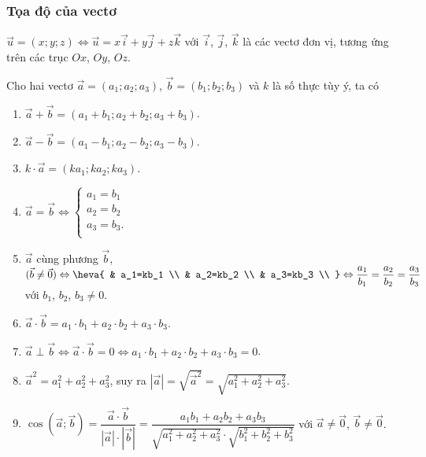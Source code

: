 \begin{tomtat}
	\subsubsection{Tọa độ của vectơ}
	\begin{dn}
		$\vec{u}=(x;y;z)\Leftrightarrow \vec{u}=x\vec{i}+y\vec{j}+z\vec{k}$ với $\vec{i}$, $\vec{j}$, $\vec{k}$ là các vectơ đơn vị, tương ứng trên các trục $Ox$, $Oy$, $Oz$.
		
	\end{dn}
	\begin{tc}
		Cho hai vectơ $\vec{a}=(a_1;a_2;a_3 )$, $\vec{b}=(b_1;b_2;b_3)$ và $k$ là số thực tùy ý, ta có
		\begin{enumerate}
			\item $\vec{a}+\vec{b}=(a_1+b_1;a_2+b_2;a_3+b_3 )$.
			\item $\vec{a}-\vec{b}=(a_1-b_1;a_2-b_2;a_3-b_3 )$.
			\item $k\cdot \vec{a}=(ka_1;ka_2;ka_3 )$.
			\item $\vec{a}=\vec{b}\Leftrightarrow \left\{ \begin{matrix}
			a_1=b_1 \\
			a_2=b_2 \\
			a_3=b_3. \\
			\end{matrix} \right.$
			\item $\vec{a}$ cùng phương $\vec{b}$, $(\vec{b}\ne \vec{0} )\Leftrightarrow  \heva{
				& a_1=kb_1 \\
				& a_2=kb_2 \\
				& a_3=kb_3 \\
			}\Leftrightarrow  \dfrac{a_1}{b_1}=\dfrac{a_2}{b_2}=\dfrac{a_3}{b_3}$ với $ b_1$,  $b_2$, $b_3\ne 0$.
			\item $\vec{a}\cdot \vec{b}=a_1\cdot b_1+a_2\cdot b_2+a_3\cdot b_3$.
			\item $\vec{a}\perp \vec{b}\Leftrightarrow \vec{a}\cdot \vec{b}=0\Leftrightarrow a_1\cdot b_1+a_2\cdot b_2+a_3\cdot b_3=0$.
			\item $\vec{a}^2=a_1^2+a_2^2+a_3^2$, suy ra $\left| \vec{a} \right|=\sqrt{\vec{a}^2}=\sqrt{a_1^2+a_2^2+a_3^2}$.
			\item $\cos (\vec{a};\vec{b} )=\dfrac{\vec{a}\cdot \vec{b}}{\left| \vec{a} \right|\cdot \left| \vec{b} \right|}=\dfrac{a_1b_1+a_2b_2+a_3b_3}{\sqrt{a_1^2+a_2^2+a_3^2}\cdot \sqrt{b_1^2+b_2^2+b_3^2}}$ với $\vec{a}\ne \vec{0}$, $\vec{b}\ne \vec{0}$.
			
		\end{enumerate}
	\end{tc}

\end{tomtat}
